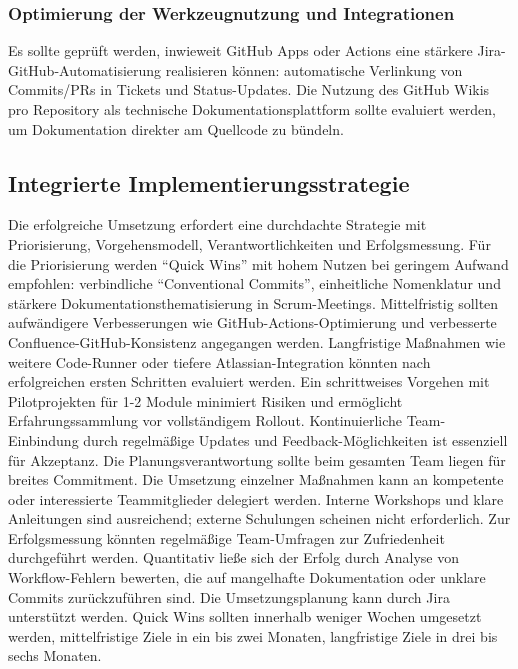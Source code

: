 \documentclass[12pt,oneside]{article}
\begin{document}
    \subsubsection{Optimierung der Werkzeugnutzung und Integrationen}
    \label{subsubsec:vk_tool_integration}
    Es sollte geprüft werden, inwieweit GitHub Apps oder Actions eine stärkere Jira-GitHub-Automatisierung realisieren können: automatische Verlinkung von Commits/PRs in Tickets und Status-Updates. Die Nutzung des GitHub Wikis pro Repository als technische Dokumentationsplattform sollte evaluiert werden, um Dokumentation direkter am Quellcode zu bündeln.

    \subsection{Integrierte Implementierungsstrategie}
    \label{subsec:integration}
    Die erfolgreiche Umsetzung erfordert eine durchdachte Strategie mit Priorisierung, Vorgehensmodell, Verantwortlichkeiten und Erfolgsmessung.
    \newline
    Für die Priorisierung werden ``Quick Wins'' mit hohem Nutzen bei geringem Aufwand empfohlen: verbindliche ``Conventional Commits'', einheitliche Nomenklatur und stärkere Dokumentationsthematisierung in Scrum-Meetings. Mittelfristig sollten aufwändigere Verbesserungen wie GitHub-Actions-Optimierung und verbesserte Confluence-GitHub-Konsistenz angegangen werden. Langfristige Maßnahmen wie weitere Code-Runner oder tiefere Atlassian-Integration könnten nach erfolgreichen ersten Schritten evaluiert werden.
    \newline
    Ein schrittweises Vorgehen mit Pilotprojekten für 1-2 Module minimiert Risiken und ermöglicht Erfahrungssammlung vor vollständigem Rollout. Kontinuierliche Team-Einbindung durch regelmäßige Updates und Feedback-Möglichkeiten ist essenziell für Akzeptanz.
    \newline
    Die Planungsverantwortung sollte beim gesamten Team liegen für breites Commitment. Die Umsetzung einzelner Maßnahmen kann an kompetente oder interessierte Teammitglieder delegiert werden. Interne Workshops und klare Anleitungen sind ausreichend; externe Schulungen scheinen nicht erforderlich.
    \newline
    Zur Erfolgsmessung könnten regelmäßige Team-Umfragen zur Zufriedenheit durchgeführt werden. Quantitativ ließe sich der Erfolg durch Analyse von Workflow-Fehlern bewerten, die auf mangelhafte Dokumentation oder unklare Commits zurückzuführen sind.
    \newline
    Die Umsetzungsplanung kann durch Jira unterstützt werden. Quick Wins sollten innerhalb weniger Wochen umgesetzt werden, mittelfristige Ziele in ein bis zwei Monaten, langfristige Ziele in drei bis sechs Monaten.
\end{document}
